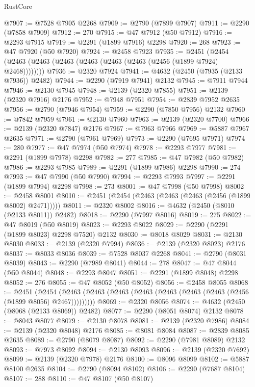 \begin{lexlean}{RustCore}
\begin{coremodule}
@7907 := @7528 @7905 @2268
@7909 := @2790 (@7899 @7907)
@7911 := @2290 (@7858 @7909)
@7912 := 270
@7915 := @47 @7912 (@50 @7912)
@7916 := @2293 @7915
@7919 := @2291 (@1899 @7916) @2298
@7920 := 268
@7923 := @47 @7920 (@50 @7920)
@7924 := @2458 @7923
@7935 := @2451 (@2454 (@2463 (@2463 (@2463 (@2463 (@2463 (@2463 (@2456 (@1899 @7924) @2468))))))))
@7936 := @2320 @7924
@7941 := @4632 (@2450 (@7935 (@2133 @7936)) @2482)
@7944 := @2290 (@7919 @7941) @2132
@7945 := @7911 @7944
@7946 := @2130 @7945
@7948 := @2139 (@2320 @7855)
@7951 := @2139 (@2320 @7916) @2176
@7952 := @7948 @7951
@7954 := @2839 @7952 @2635
@7956 := @2790 (@7946 @7954)
@7959 := @2290 (@7850 @7956) @2132
@7960 := @7842 @7959
@7961 := @2130 @7960
@7963 := @2139 (@2320 @7700)
@7966 := @2139 (@2320 @7847) @2176
@7967 := @7963 @7966
@7969 := @5887 @7967 @2635
@7971 := @2790 (@7961 @7969)
@7973 := @2290 (@7695 @7971)
@7974 := 280
@7977 := @47 @7974 (@50 @7974)
@7978 := @2293 @7977
@7981 := @2291 (@1899 @7978) @2298
@7982 := 277
@7985 := @47 @7982 (@50 @7982)
@7986 := @2293 @7985
@7989 := @2291 (@1899 @7986) @2298
@7990 := 274
@7993 := @47 @7990 (@50 @7990)
@7994 := @2293 @7993
@7997 := @2291 (@1899 @7994) @2298
@7998 := 273
@8001 := @47 @7998 (@50 @7998)
@8002 := @2458 @8001
@8010 := @2451 (@2454 (@2463 (@2463 (@2463 (@2456 (@1899 @8002) @2471)))))
@8011 := @2320 @8002
@8016 := @4632 (@2450 (@8010 (@2133 @8011)) @2482)
@8018 := @2290 (@7997 @8016)
@8019 := 275
@8022 := @47 @8019 (@50 @8019)
@8023 := @2293 @8022
@8029 := @2290 (@2291 (@1899 @8023) @2298 @7520) @2132
@8030 := @8018 @8029
@8031 := @2130 @8030
@8033 := @2139 (@2320 @7994)
@8036 := @2139 (@2320 @8023) @2176
@8037 := @8033 @8036
@8039 := @7528 @8037 @2268
@8041 := @2790 (@8031 @8039)
@8043 := @2290 (@7989 @8041)
@8044 := 278
@8047 := @47 @8044 (@50 @8044)
@8048 := @2293 @8047
@8051 := @2291 (@1899 @8048) @2298
@8052 := 276
@8055 := @47 @8052 (@50 @8052)
@8056 := @2458 @8055
@8068 := @2451
    (@2454 (@2463 (@2463 (@2463 (@2463 (@2463 (@2463 (@2463 (@2456 (@1899 @8056) @2467)))))))))
@8069 := @2320 @8056
@8074 := @4632 (@2450 (@8068 (@2133 @8069)) @2482)
@8077 := @2290 (@8051 @8074) @2132
@8078 := @8043 @8077
@8079 := @2130 @8078
@8081 := @2139 (@2320 @7986)
@8084 := @2139 (@2320 @8048) @2176
@8085 := @8081 @8084
@8087 := @2839 @8085 @2635
@8089 := @2790 (@8079 @8087)
@8092 := @2290 (@7981 @8089) @2132
@8093 := @7973 @8092
@8094 := @2130 @8093
@8096 := @2139 (@2320 @7692)
@8099 := @2139 (@2320 @7978) @2176
@8100 := @8096 @8099
@8102 := @5887 @8100 @2635
@8104 := @2790 (@8094 @8102)
@8106 := @2290 (@7687 @8104)
@8107 := 288
@8110 := @47 @8107 (@50 @8107)

\end{coremodule}
\end{lexlean}
